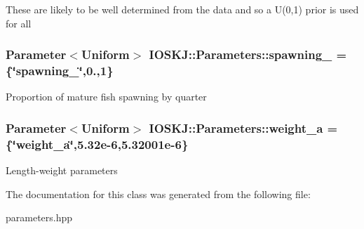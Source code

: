 These are likely to be well determined from the data and so a U(0,1) prior is used for all \hypertarget{classIOSKJ_1_1Parameters_a28bbbb27c4d4ae15fa93469b93553fd6}{
\subsubsection[{spawning\-\_\-0}]{\setlength{\rightskip}{0pt plus 5cm}Parameter$<$Uniform$>$ I\-O\-S\-K\-J\-::\-Parameters\-::spawning\-\_ = \{\char`\"{}spawning\-\_\char`\"{},0.,1\}}}\label{classIOSKJ_1_1Parameters_a28bbbb27c4d4ae15fa93469b93553fd6}
Proportion of mature fish spawning by quarter \hypertarget{classIOSKJ_1_1Parameters_a522571c48a9b3e5c82315da4f3498865}{
\subsubsection[{weight\-\_\-a}]{\setlength{\rightskip}{0pt plus 5cm}Parameter$<$Uniform$>$ I\-O\-S\-K\-J\-::\-Parameters\-::weight\-\_\-a = \{\char`\"{}weight\-\_\-a\char`\"{},5.\-32e-\/6,5.\-32001e-\/6\}}}\label{classIOSKJ_1_1Parameters_a522571c48a9b3e5c82315da4f3498865}
Length-\/weight parameters 

The documentation for this class was generated from the following file\-:\begin{DoxyCompactItemize}
\item 
parameters.\-hpp\end{DoxyCompactItemize}
